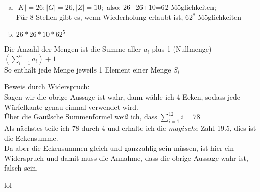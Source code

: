 \documentclass{disloloesung}
\begin{document}
\begin{sheet}{1}

    \begin{aufgabe}{1.1}{}
	\begin{enumerate}[(a)]
	  \item $|K| = 26; |G| = 26, |Z| = 10;$ also: 26+26+10=62 Möglichkeiten; \\ Für 8 Stellen gibt es, wenn Wiederholung erlaubt ist, $62^8$ Möglichkeiten
	  \item $26*26*10*62^5$
	\end{enumerate}
    \end{aufgabe}

    \begin{aufgabe}{1.2}{}
	Die Anzahl der Mengen ist die Summe aller $a_{i}$ plus 1 (Nullmenge)
	$(\sum\limits_{i=1}^{n} a_{i}) +1$ \\
	So enthält jede Menge jeweils 1 Element einer Menge $S_{i}$
    \end{aufgabe}

    \begin{aufgabe}{1.3}{}
	Beweis durch Widerspruch:\\
	Sagen wir die obrige Aussage ist wahr, dann wähle ich 4 Ecken, sodass jede Würfelkante genau einmal verwendet wird.\\ Über die Gaußsche Summenformel 
	weiß ich, dass $\sum\limits_{i=1}^{12} i = 78$\\
	Als nächstes teile ich 78 durch 4 und erhalte ich die $magische$ Zahl 19.5, dies ist die Eckensumme.\\ Da aber die Eckensummen gleich und ganzzahlig sein müssen, ist hier ein Widerspruch und damit muss die Annahme, dass die obrige Aussage wahr ist, falsch sein.
    \end{aufgabe}
    
    \begin{aufgabe}{1.4}{}
	lol
    \end{aufgabe}

\end{sheet}
\end{document}
